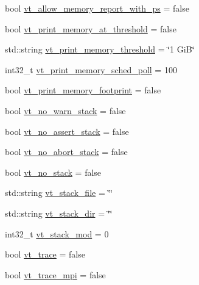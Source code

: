 \begin{DoxyCompactItemize}
\item 
bool \hyperlink{structvt_1_1arguments_1_1_app_config_a40e8cdecd312fab611e262b12324d1bd}{vt\+\_\+allow\+\_\+memory\+\_\+report\+\_\+with\+\_\+ps} = false
\item 
bool \hyperlink{structvt_1_1arguments_1_1_app_config_a7f53d72ccd7261b0e959fdc8d86df3a3}{vt\+\_\+print\+\_\+memory\+\_\+at\+\_\+threshold} = false
\item 
std\+::string \hyperlink{structvt_1_1arguments_1_1_app_config_a3f564c6296069d6cf478a3f43ba9e8a4}{vt\+\_\+print\+\_\+memory\+\_\+threshold} = \char`\"{}1 GiB\char`\"{}
\item 
int32\+\_\+t \hyperlink{structvt_1_1arguments_1_1_app_config_af139aee07bf04d392501a4ee19478e31}{vt\+\_\+print\+\_\+memory\+\_\+sched\+\_\+poll} = 100
\item 
bool \hyperlink{structvt_1_1arguments_1_1_app_config_a02c45d00245e26942512287e048489a0}{vt\+\_\+print\+\_\+memory\+\_\+footprint} = false
\item 
bool \hyperlink{structvt_1_1arguments_1_1_app_config_a745524c2e7ac750835940972cdebf3c3}{vt\+\_\+no\+\_\+warn\+\_\+stack} = false
\item 
bool \hyperlink{structvt_1_1arguments_1_1_app_config_af5a38d00691ff72e08847ab5091f6345}{vt\+\_\+no\+\_\+assert\+\_\+stack} = false
\item 
bool \hyperlink{structvt_1_1arguments_1_1_app_config_a47012ebf82f55c03e8659e1df32ebe58}{vt\+\_\+no\+\_\+abort\+\_\+stack} = false
\item 
bool \hyperlink{structvt_1_1arguments_1_1_app_config_a9738d4749047b9a796d7db8a20e29182}{vt\+\_\+no\+\_\+stack} = false
\item 
std\+::string \hyperlink{structvt_1_1arguments_1_1_app_config_a8230bcba38ca9003f8cd507886572743}{vt\+\_\+stack\+\_\+file} = \char`\"{}\char`\"{}
\item 
std\+::string \hyperlink{structvt_1_1arguments_1_1_app_config_a364ee3b9e5ed25590d1c4dea55731e6c}{vt\+\_\+stack\+\_\+dir} = \char`\"{}\char`\"{}
\item 
int32\+\_\+t \hyperlink{structvt_1_1arguments_1_1_app_config_aa93f6ff7f613f402638deab33cc28adb}{vt\+\_\+stack\+\_\+mod} = 0
\item 
bool \hyperlink{structvt_1_1arguments_1_1_app_config_a863d6b2a20ba63ac85f4de2bd8cbe75c}{vt\+\_\+trace} = false
\item 
bool \hyperlink{structvt_1_1arguments_1_1_app_config_a76934e4c1a8c3b9b1eedaf87977330ec}{vt\+\_\+trace\+\_\+mpi} = false
\item 

\end{DoxyCompactItemize}
